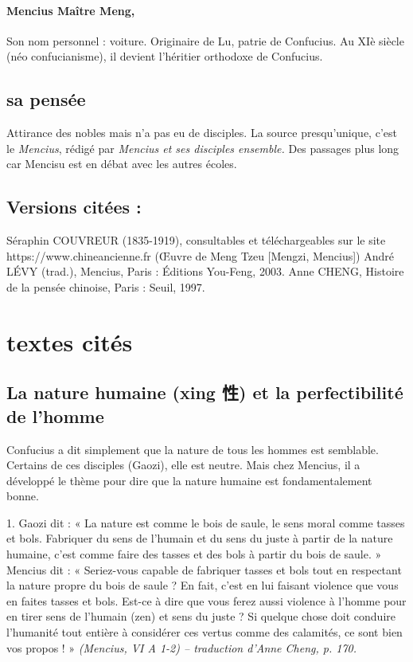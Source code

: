 \paragraph{Mencius Maître Meng,}
 Son nom personnel : voiture. Originaire de Lu, patrie de Confucius. Au XIè siècle (néo confucianisme), il devient l'héritier orthodoxe de Confucius.

\subsection{sa pensée}

Attirance des nobles mais n'a pas eu de disciples.
La source presqu'unique, c'est le \textit{Mencius}, rédigé par \textit{Mencius et ses disciples ensemble.} Des passages plus long car Mencisu est en débat avec les autres écoles. 

\subsection{Versions citées :}

Séraphin	COUVREUR	(1835-1919),	consultables	et	téléchargeables	sur	le	site https://www.chineancienne.fr (Œuvre de Meng Tzeu [Mengzi, Mencius])
André LÉVY (trad.), Mencius, Paris : Éditions You-Feng, 2003. Anne CHENG, Histoire de la pensée chinoise, Paris : Seuil, 1997.


\section{textes cités}

\subsection{La nature humaine (xing 性) et la perfectibilité de l’homme}

Confucius a dit simplement que la nature de tous les hommes est semblable. Certains de ces disciples (Gaozi), elle est neutre. Mais chez Mencius, il a développé le thème pour dire que la nature humaine est fondamentalement bonne. 


\begin{singlequote}
    1.	Gaozi dit : « La nature est comme le bois de saule, le sens moral comme tasses et bols. Fabriquer du sens de l’humain et du sens du juste à partir de la nature humaine, c’est comme faire des tasses et des bols à partir du bois de saule. »
Mencius dit : « Seriez-vous capable de fabriquer tasses et bols tout en respectant la nature propre du bois de saule ? En fait, c’est en lui faisant violence que vous en faites tasses et bols. Est-ce à dire que vous ferez aussi violence à l’homme pour en tirer sens de l’humain (zen) et sens du juste ? Si quelque chose doit conduire l’humanité tout entière à considérer ces vertus comme des calamités, ce sont bien vos propos ! » 
 \textit{\small (Mencius, VI A 1-2)
-- traduction d’Anne Cheng, p. 170.}
\end{singlequote}

